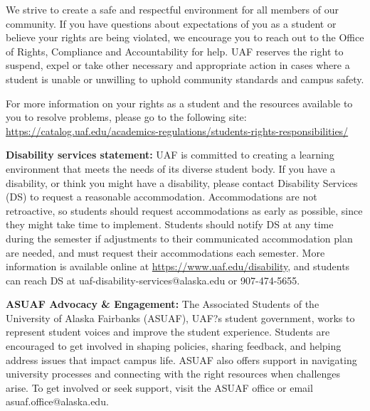 \documentclass[11pt]{article}
\renewcommand{\emph}[1]{\textsf{\textbf{#1}}}
\begin{document}
We strive to create a safe and respectful environment for all members of our community. If you have questions about expectations of you as a student or believe your rights are being violated, we encourage you to reach out to the  Office of Rights, Compliance and Accountability for help. UAF reserves the right to suspend, expel or take other necessary and appropriate action in cases where a student is unable or unwilling to uphold community standards and campus safety.

For more information on your rights as a student and the resources available to you to resolve problems, please go to the following site:\\ \url{https://catalog.uaf.edu/academics-regulations/students-rights-responsibilities/}

\noindent\emph{Disability services statement:}  UAF is committed to creating a learning environment that meets the needs of its diverse student body.  If you have a disability, or think you might have a disability, please contact Disability Services (DS) to request a reasonable accommodation.  Accommodations are not retroactive, so students should request accommodations as early as possible, since they might take time to implement.  Students should notify DS at any time during the semester if adjustments to their communicated accommodation plan are needed, and must request their accommodations each semester.  More information is available online at \url{https://www.uaf.edu/disability}, and students can reach DS at uaf-disability-services@alaska.edu or 907-474-5655.


\noindent\emph{ASUAF Advocacy \& Engagement:} The Associated Students of the University of Alaska Fairbanks (ASUAF), UAF?s student government, works to represent student voices and improve the student experience. Students are encouraged to get involved in shaping policies, sharing feedback, and helping address issues that impact campus life. ASUAF also offers support in navigating university processes and connecting with the right resources when challenges arise. To get involved or seek support, visit the ASUAF office or email asuaf.office@alaska.edu. 

 
\end{document}

